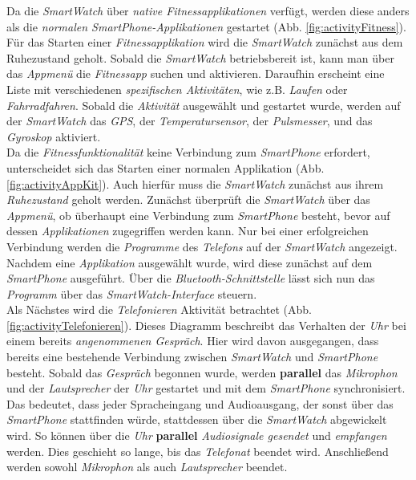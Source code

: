 Da die \textit{SmartWatch} über \textit{\gls{native} Fitnessapplikationen} verfügt, werden diese anders als die \textit{normalen SmartPhone-Applikationen} gestartet (Abb. \ref{fig:activityFitness}).
Für das Starten einer \textit{Fitnessapplikation} wird die \textit{SmartWatch} zunächst aus dem Ruhezustand geholt. Sobald die \textit{SmartWatch} betriebsbereit ist, kann man über das \textit{Appmenü} die \textit{Fitnessapp} suchen und aktivieren. Daraufhin erscheint eine Liste mit verschiedenen \textit{spezifischen Aktivitäten}, wie z.B. \textit{Laufen} oder \textit{Fahrradfahren}. Sobald die \textit{Aktivität} ausgewählt und gestartet wurde, werden auf der \textit{SmartWatch} das \textit{GPS}, der \textit{Temperatursensor}, der \textit{Pulsmesser}, und das \textit{Gyroskop} aktiviert.\\
Da die \textit{Fitnessfunktionalität} keine Verbindung zum \textit{SmartPhone} erfordert, unterscheidet sich das Starten einer normalen Applikation (Abb. \ref{fig:activityAppKit}). Auch hierfür muss die \textit{SmartWatch} zunächst aus ihrem \textit{Ruhezustand} geholt werden. Zunächst überprüft die \textit{SmartWatch} über das \textit{Appmenü}, ob überhaupt eine Verbindung zum \textit{SmartPhone} besteht, bevor auf dessen \textit{Applikationen} zugegriffen werden kann. Nur bei einer erfolgreichen Verbindung werden die \textit{Programme} des \textit{Telefons} auf der \textit{SmartWatch} angezeigt. Nachdem eine \textit{Applikation} ausgewählt wurde, wird diese zunächst auf dem \textit{SmartPhone} ausgeführt. Über die \textit{Bluetooth-Schnittstelle} lässt sich nun das \textit{Programm} über das \textit{SmartWatch-Interface} steuern.\\
Als Nächstes wird die \textit{Telefonieren} Aktivität betrachtet (Abb. \ref{fig:activityTelefonieren}). Dieses Diagramm beschreibt das Verhalten der \textit{Uhr} bei einem bereits \textit{angenommenen Gespräch}. Hier wird davon ausgegangen, dass bereits eine bestehende Verbindung zwischen \textit{SmartWatch} und \textit{SmartPhone} besteht. Sobald das \textit{Gespräch} begonnen wurde, werden \textbf{parallel} das \textit{Mikrophon} und der \textit{Lautsprecher} der \textit{Uhr} gestartet und mit dem \textit{SmartPhone} synchronisiert. Das bedeutet, dass jeder Spracheingang und Audioausgang, der sonst über das \textit{SmartPhone} stattfinden würde, stattdessen über die \textit{SmartWatch} abgewickelt wird. So können über die \textit{Uhr} \textbf{parallel} \textit{Audiosignale gesendet} und \textit{empfangen} werden. Dies geschieht so lange, bis das \textit{Telefonat} beendet wird. Anschließend werden sowohl \textit{Mikrophon} als auch \textit{Lautsprecher} beendet.\\
